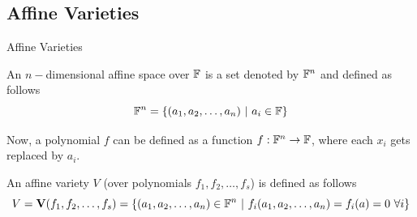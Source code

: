 \documentclass[aspectratio=169, handout, 10pt, hyperref=colorlinks]{beamer}
\begin{document}
\subsection{Affine Varieties}
\begin{frame}{Affine Varieties}
    \begin{defn}
    An $n-$dimensional affine space over $\mathbb{F}$ is a set denoted by $\mathbb{F}^n$ and defined as follows
    \begin{equation}
        \mathbb{F}^n = \{(a_1,a_2,\ldots,a_n) \ |\ a_i \in \mathbb{F}\}
    \end{equation}    
\end{defn}
Now, a polynomial $f$ can be defined as a function $f:\mathbb{F}^n\rightarrow\mathbb{F}$, where each $x_i$ gets replaced by $a_i$.
\begin{defn}
    An affine variety $V$ (over polynomials $f_1,f_2,\ldots,f_s$) is defined as follows 
    \begin{equation}
        V = \V(f_1,f_2,\ldots,f_s) = \{(a_1, a_2, \ldots, a_n) \in \F^n \ |\ f_i(a_1, a_2, \ldots, a_n)=f_i(a)=0 \ \forall i \}
    \end{equation}
\end{defn}
\end{frame}
\end{document}

